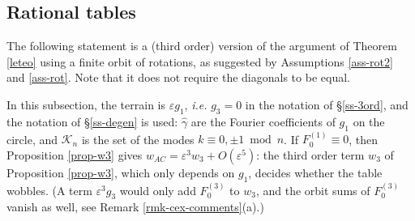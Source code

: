 \documentclass[a4paper,11pt,twoside,leqno]{article}
\newcommand{\ie}[0]{\emph{i.e.} }
\newcommand{\eps}[0]{\varepsilon}
\numberwithin{equation}{section}
\begin{document}
\subsection{Rational tables}\label{ss-rational}

The following statement is a (third order) version of the argument of Theorem \ref{leteo} using a finite orbit of rotations, as suggested by Assumptions \ref{ass-rot2} and \ref{ass-rot}. Note that it does not require the diagonals to be equal.

In this subsection, the terrain is $\eps g_1$, \ie $g_3 = 0$ in the notation of \S{}\ref{ss-3ord}, and the notation of \S{}\ref{ss-degen} is used: $\hat\gamma$ are the Fourier coefficients of $g_1$ on the circle, and $\mathcal{K}_n$ is the set of the modes $k \equiv 0, \pm 1 \bmod n$. If $F_0^{(1)} \equiv 0$, then Proposition \ref{prop-w3} gives $w_{AC} = \eps^3 w_3 + O(\eps^5)$: the third order term $w_3$ of Proposition \ref{prop-w3}, which only depends on $g_1$, decides whether the table wobbles. (A term $\eps^3 g_3$ would only add $F_0^{(3)}$ to $w_3$, and the orbit sums of $F_0^{(3)}$ vanish as well, see Remark \ref{rmk-cex-comments}(a).)
\end{document}

